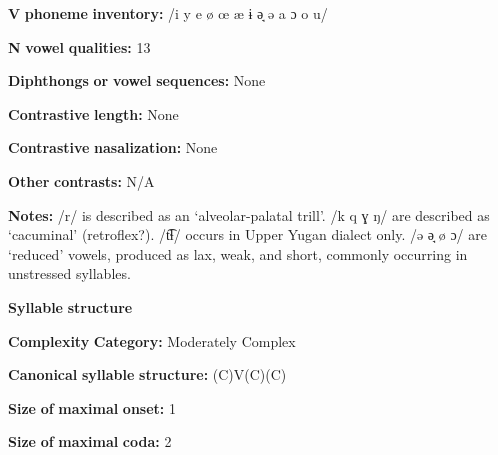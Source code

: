\documentclass[output=paper]{langsci/langscibook}
\begin{document}
\begin{styleBody}
\textbf{V} \textbf{phoneme} \textbf{inventory:} /i y e ø œ æ ɨ ə̘ ə a ɔ o u/
\end{styleBody}

\begin{styleBody}
\textbf{N} \textbf{vowel} \textbf{qualities:} 13
\end{styleBody}

\begin{styleBody}
\textbf{Diphthongs} \textbf{or} \textbf{vowel} \textbf{sequences:} None
\end{styleBody}

\begin{styleBody}
\textbf{Contrastive} \textbf{length:} None
\end{styleBody}

\begin{styleBody}
\textbf{Contrastive} \textbf{nasalization:} None
\end{styleBody}

\begin{styleBody}
\textbf{Other} \textbf{contrasts:} N/A
\end{styleBody}

\begin{styleBody}
\textbf{Notes:} /r/ is described as an ‘alveolar-palatal trill’. /k q ɣ ŋ/ are described as ‘cacuminal’ (retroflex?). /t͡ɬ/ occurs in Upper Yugan dialect only. /ə ə̘ ø ɔ/ are ‘reduced’ vowels, produced as lax, weak, and short, commonly occurring in unstressed syllables.
\end{styleBody}

\begin{styleBody}
\textbf{Syllable} \textbf{structure}
\end{styleBody}

\begin{styleBody}
\textbf{Complexity} \textbf{Category:} Moderately Complex
\end{styleBody}

\begin{styleBody}
\textbf{Canonical} \textbf{syllable} \textbf{structure:} (C)V(C)(C) \citep[53-7]{Filchenko2007}
\end{styleBody}

\begin{styleBody}
\textbf{Size} \textbf{of} \textbf{maximal} \textbf{onset:} 1
\end{styleBody}

\begin{styleBody}
\textbf{Size} \textbf{of} \textbf{maximal} \textbf{coda:} 2
\end{styleBody}
\end{document}
